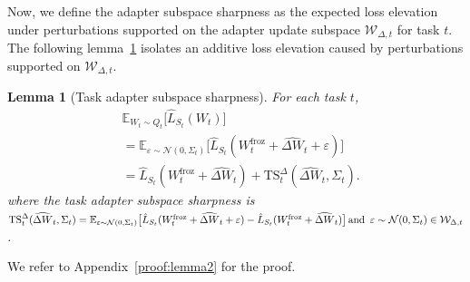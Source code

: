 \documentclass{article}
\theoremstyle{plain}
\newtheorem{lemma}[theorem]{Lemma}
\theoremstyle{definition}
\theoremstyle{remark}
\begin{document}
 
Now, we define the adapter subspace sharpness as the expected loss elevation under perturbations supported on the adapter update subspace $\mathcal W_{\Delta,t}$ for task $t$. The following lemma~\ref{lem:subspace-loss-pecl} isolates an additive loss elevation caused by perturbations supported on $\mathcal W_{\Delta,t}$.

\begin{lemma}[Task adapter subspace sharpness]
\label{lem:subspace-loss-pecl}
For each task $t$,
{%
\setlength{\abovedisplayskip}{1pt}
\setlength{\belowdisplayskip}{2pt}
\setlength{\abovedisplayshortskip}{1pt}
\setlength{\belowdisplayshortskip}{2pt}
\begin{equation*}
\label{eq:subspace-loss-pecl}
\begin{aligned}
&\mathbb E_{W_t\sim Q_t}\bigl[\hat L_{S_t}(W_t)\bigr] \\
&= \mathbb{E}_{\varepsilon\sim\mathcal N(0,\Sigma_t)}
    \big[\hat{L}_{S_t}(W^{\mathrm{froz}}_t+\widehat{\Delta W}_t+\varepsilon)\big] \\
& =\hat L_{S_t}(W^{\mathrm{froz}}_t + \widehat{\Delta W}_t)
+
\mathrm{TS}_t^{\Delta}(\widehat{\Delta W}_t,\Sigma_t).
\end{aligned}
\end{equation*}
}where the task adapter subspace sharpness is $
\mathrm{TS}_t^{\Delta}(\widehat{\Delta W}_t,\Sigma_t)
= \mathbb{E}_{\varepsilon\sim\mathcal N(0,\Sigma_t)}
   \big[\hat{L}_{S_t}(W^{\mathrm{froz}}_t+\widehat{\Delta W}_t+\varepsilon)
   - \hat{L}_{S_t}(W^{\mathrm{froz}}_t+\widehat{\Delta W}_t)\big] \text{\,and\, } 
     \varepsilon\sim\mathcal N(0,\Sigma_t) \in  \mathcal W_{\Delta,t}$.
     \end{lemma}

We refer to Appendix~\ref{proof:lemma2} for the proof.
\end{document}
